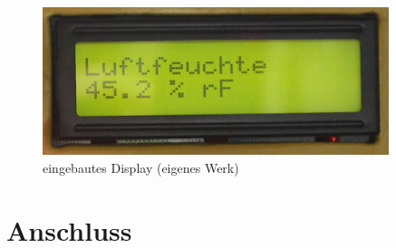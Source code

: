 \begin{figure}[h]
  \centering
     \includegraphics[width=0.9\textwidth]{figures/display.jpg}
  \caption{eingebautes Display (eigenes Werk)}
  \label{fig:display}
\end{figure}

\section{Anschluss}
